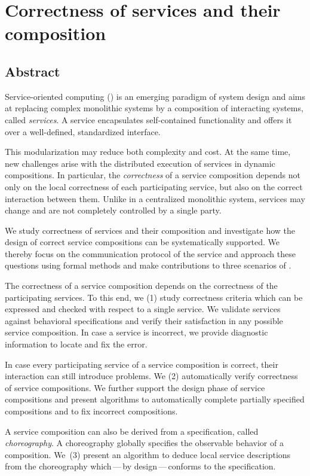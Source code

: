 \chapter*{Correctness of services and their composition}
\section*{Abstract}

Service-oriented computing () is an emerging paradigm of system design and aims at replacing complex monolithic systems by a composition of interacting systems, called \emph{services}. A service encapsulates self-contained functionality and offers it over a well-defined, standardized interface.

This modularization may reduce both complexity and cost. At the same time, new challenges arise with the distributed execution of services in dynamic compositions. In particular, the \emph{correctness} of a service composition depends not only on the local correctness of each participating service, but also on the correct interaction between them. Unlike in a centralized monolithic system, services may change and are not completely controlled by a single party.

We study correctness of services and their composition and investigate how the design of correct service compositions can be systematically supported. We thereby focus on the communication protocol of the service and approach these questions using formal methods and make contributions to three scenarios of .

The correctness of a service composition depends on the correctness of the participating services. To this end, we (1) study correctness criteria which can be expressed and checked with respect to a single service. We validate services against behavioral specifications and verify their satisfaction in any possible service composition. In case a service is incorrect, we provide diagnostic information to locate and fix the error.

In case every participating service of a service composition is correct, their interaction can still introduce problems. We (2) automatically verify correctness of service compositions. We further support the design phase of service compositions and present algorithms to automatically complete partially specified compositions and to fix incorrect compositions.

A service composition can also be derived from a specification, called \emph{choreography}. A choreography globally specifies the observable behavior of a composition. We~(3) present an algorithm to deduce local service descriptions from the choreography which\,---\,by design\,---\,conforms to the specification.


